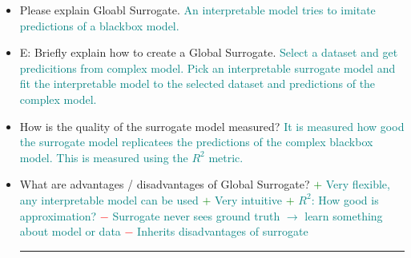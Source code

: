 \documentclass{report}
\newcommand{\asw}[2][teal]{}
\renewcommand{\asw}[2][teal]{\textcolor{#1}{#2}}
\begin{document}
\begin{itemize}
	\item Please explain Gloabl Surrogate.
	\asw{\newline An interpretable model tries to imitate predictions of a blackbox model.}
	\item E: Briefly explain how to create a Global Surrogate.
	\asw{\newline Select a dataset and get predicitions from complex model. Pick an interpretable surrogate model and fit the interpretable model to the selected dataset and predictions of the complex model.}
	\item How is the quality of the surrogate model measured?
	\asw{\newline It is measured how good the surrogate model replicatees the predictions of the complex blackbox model. This is measured using the $R^2$ metric.}
	\item What are advantages / disadvantages of Global Surrogate?
	\asw{\newline \textcolor{green}{$+$} Very flexible, any interpretable model can be used
		\newline \textcolor{green}{$+$} Very intuitive
		\newline \textcolor{green}{$+$} $R^2$: How good is approximation?
		\newline \textcolor{red}{$-$} Surrogate never sees ground truth $\rightarrow$ learn something about model or data
		\newline \textcolor{red}{$-$} Inherits disadvantages of surrogate}
	\newline
	\hrule 
	

\end{itemize}
\end{document}
